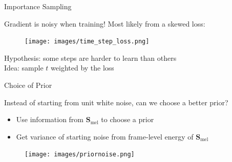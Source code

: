\documentclass{beamer}
\begin{document}



\begin{frame}{Importance Sampling}

    \vspace{0.5cm}

    Gradient is noisy when training! Most likely from a skewed loss:

    \begin{figure}[H]
        \centering
        \texttt{[image: images/time\_step\_loss.png]}
    \end{figure}

    Hypothesis: some steps are harder to learn than others \\
    \vspace{0.5cm}
    Idea: sample $t$ weighted by the loss 
    
\end{frame}


\begin{frame}{Choice of Prior}
    \vspace{0.2cm}

    Instead of starting from unit white noise, can we choose a better prior?
    
    \pause

    \begin{itemize}
        \item Use information from $\bm{S}_{\text{mel}}$ to choose a prior
        \pause
        \item Get variance of starting noise from frame-level energy of $\bm{S}_{\text{mel}}$
    \end{itemize}
    
    \pause

    \begin{figure}[H]
        \centering
        \texttt{[image: images/priornoise.png]}
    \end{figure}

\end{frame}
\end{document}
